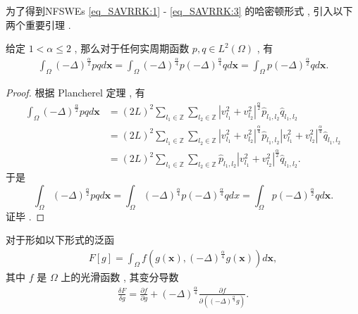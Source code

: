 为了得到NFSWEs \eqref{eq_SAVRRK:1} - \eqref{eq_SAVRRK:3} 的哈密顿形式 , 引入以下两个重要引理 . 
\begin{lemma}\label{lem_PAVF:1}
	\cite{fuStructurepreservingAlgorithmsTwodimensional2020} 
	 给定 $1<\alpha \leq 2$ , 那么对于任何实周期函数 $p , q \in L^{2}(\Omega)$ , 有
	\begin{align}\label{eq_PAVF:22}
	\int_{\Omega}(-\Delta)^{\frac{\alpha}{2}} p q d \boldsymbol{x}=\int_{\Omega}(-\Delta)^{\frac{\alpha}{4}} p(-\Delta)^{\frac{\alpha}{4}} q d \boldsymbol{x}=\int_{\Omega} p(-\Delta)^{\frac{\alpha}{2}} q d \boldsymbol{x} . 
	\end{align}
	\end{lemma}

\begin{proof}
	根据 Plancherel 定理 , 有
\begin{equation}
\begin{aligned}
\int_{\Omega}(-\Delta)^{\frac{\alpha}{2}} p q d \boldsymbol{x} &=(2 L)^{2} \sum_{l_{1} \in \mathbb{Z}} \sum_{l_{2} \in \mathbb{Z}}\left|v_{l_{1}}^{2}+v_{l_{2}}^{2}\right|^{\frac{\alpha}{2}} \hat{p}_{l_{1} , l_{2}} \hat{q}_{l_{1} , l_{2}} \\
&=(2 L)^{2} \sum_{l_{1} \in \mathbb{Z}} \sum_{l_{2} \in \mathbb{Z}}\left|v_{l_{1}}^{2}+v_{l_{2}}^{2}\right|^{\frac{\alpha}{4}} \hat{p}_{l_{1} , l_{2}}\left|v_{l_{1}}^{2}+v_{l_{2}}^{2}\right|^{\frac{\alpha}{4}} \hat{q}_{l_{1} , l_{2}} \\
&=(2 L)^{2} \sum_{l_{1} \in \mathbb{Z}} \sum_{l_{2} \in \mathbb{Z}} \hat{p}_{l_{1} , l_{2}}\left|v_{l_{1}}^{2}+v_{l_{2}}^{2}\right|^{\frac{\alpha}{2}} \hat{q}_{l_{1} , l_{2}}  . 
\end{aligned}
\label{eq_23}\end{equation}
于是
\begin{equation}
\int_{\Omega}(-\Delta)^{\frac{\alpha}{2}} p q d \boldsymbol{x}=\int_{\Omega}(-\Delta)^{\frac{\alpha}{4}} p(-\Delta)^{\frac{\alpha}{4}} q d x=\int_{\Omega} p(-\Delta)^{\frac{\alpha}{2}} q d \boldsymbol{x}.
\label{eq_24}\end{equation}
证毕 . 
\end{proof}


\begin{lemma}\label{lem_PAVF:2}
	\cite{wangStructurepreservingNumericalMethods2018} 
	 对于形如以下形式的泛函
	\begin{align}\label{eq_PAVF:25}
	F[g]=\int_{\Omega} f\left(g(\boldsymbol{x}) , (-\Delta)^{\frac{\alpha}{4}} g(\boldsymbol{x})\right) d \boldsymbol{x} , 
	\end{align}
	其中 $f$ 是 $\Omega$ 上的光滑函数 , 其变分导数
	\begin{align}\label{eq_PAVF:26}
	\frac{\delta F}{\delta g}=\frac{\partial f}{\partial g}+(-\Delta)^{\frac{\alpha}{4}} \frac{\partial f}{\partial\left((-\Delta)^{\frac{\alpha}{4}} g\right)}  . 
	\end{align}
	\end{lemma}

